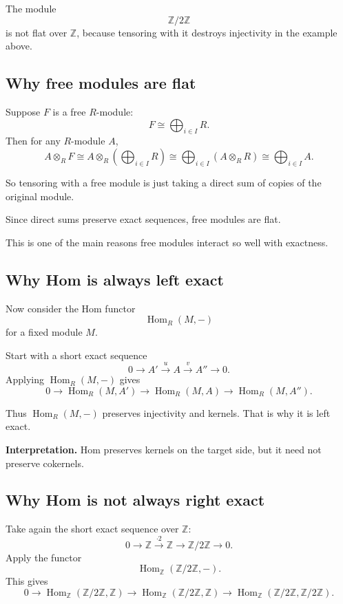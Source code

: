 \documentclass[12pt,a4paper]{article}
\theoremstyle{notespace}
\theoremstyle{definition}
\begin{document}
The module
\[
\mathbb Z/2\mathbb Z
\]
is not flat over \(\mathbb Z\), because tensoring with it destroys injectivity in the example above.

\subsection{ Why free modules are flat}

Suppose \(F\) is a free \(R\)-module:
\[
F\cong \bigoplus_{i\in I} R.
\]
Then for any \(R\)-module \(A\),
\[
A\otimes_R F
\cong
A\otimes_R \left(\bigoplus_{i\in I} R\right)
\cong
\bigoplus_{i\in I}(A\otimes_R R)
\cong
\bigoplus_{i\in I} A.
\]

So tensoring with a free module is just taking a direct sum of copies of the original module.

Since direct sums preserve exact sequences, free modules are flat.

This is one of the main reasons free modules interact so well with exactness.

\subsection{ Why Hom is always left exact}

Now consider the Hom functor
\[
\operatorname{Hom}_R(M,-)
\]
for a fixed module \(M\).

Start with a short exact sequence
\[
0 \longrightarrow A' \xrightarrow{u} A \xrightarrow{v} A'' \longrightarrow 0.
\]
Applying \(\operatorname{Hom}_R(M,-)\) gives
\[
0 \longrightarrow \operatorname{Hom}_R(M,A')
\longrightarrow \operatorname{Hom}_R(M,A)
\longrightarrow \operatorname{Hom}_R(M,A'').
\]

Thus \(\operatorname{Hom}_R(M,-)\) preserves injectivity and kernels.
That is why it is left exact.

\medskip

\textbf{Interpretation.}
Hom preserves kernels on the target side, but it need not preserve cokernels.

\subsection{ Why Hom is not always right exact}

Take again the short exact sequence over \(\mathbb Z\):
\[
0 \longrightarrow \mathbb Z \xrightarrow{\cdot 2} \mathbb Z \longrightarrow \mathbb Z/2\mathbb Z \longrightarrow 0.
\]
Apply the functor
\[
\operatorname{Hom}_{\mathbb Z}(\mathbb Z/2\mathbb Z,-).
\]
This gives
\[
0 \longrightarrow \operatorname{Hom}_{\mathbb Z}(\mathbb Z/2\mathbb Z,\mathbb Z)
\longrightarrow \operatorname{Hom}_{\mathbb Z}(\mathbb Z/2\mathbb Z,\mathbb Z)
\longrightarrow \operatorname{Hom}_{\mathbb Z}(\mathbb Z/2\mathbb Z,\mathbb Z/2\mathbb Z).
\]
\end{document}
